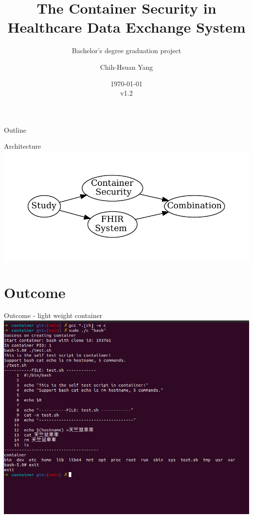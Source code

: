 \documentclass{beamer}
\title{The Container Security in Healthcare Data Exchange System}
\subtitle{Bachelor's degree graduation project}
\author{Chih-Hsuan Yang}
\institute{National Sun Yat-sen University\\
Advisor: Chun-I Fan
}
\date{\today\\v1.2}
\begin{document}
\begin{frame}
    \titlepage
\end{frame}

\begin{frame}{Outline}
    \begin{multicols}{2}
        \tableofcontents
    \end{multicols}
\end{frame}


\begin{frame}{Architecture}
    \includegraphics[width=\textwidth]{methFlow.pdf}
\end{frame}

\section{Outcome}
\begin{frame}{Outcome - light weight container}
    \centering\includegraphics[width=.9\textwidth]{lc.png}
\end{frame}
\end{document}
